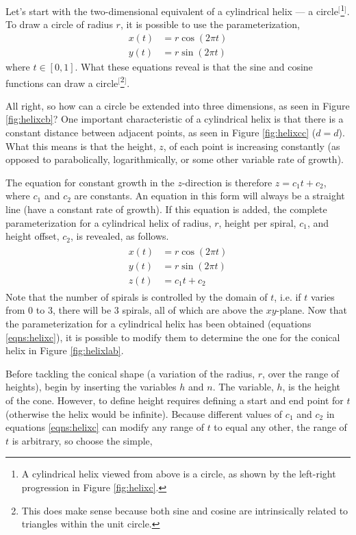 \documentclass{article}
\begin{document}
Let's start with the two-dimensional equivalent of a cylindrical helix --- a circle$^[$\footnote{A cylindrical helix viewed from above is a circle, as shown by the left-right progression in Figure \ref{fig:helixc}.}$^]$. To draw a circle of radius $r$, it is possible to use the parameterization,
\begin{align*}
    x(t) &= r\cos(2\pi t)\\
    y(t) &= r\sin(2\pi t)
\end{align*}
where $t\in[0,1]$. What these equations reveal is that the sine and cosine functions can draw a circle$^[$\footnote{This does make sense because both sine and cosine are intrinsically related to triangles within the unit circle.}$^]$.\par
All right, so how can a circle be extended into three dimensions, as seen in Figure \ref{fig:helixcb}? One important characteristic of a cylindrical helix is that there is a constant distance between adjacent points, as seen in Figure \ref{fig:helixcc} ($d=d$). What this means is that the height, $z$, of each point is increasing constantly (as opposed to parabolically, logarithmically, or some other variable rate of growth).\par
The equation for constant growth in the $z$-direction is therefore $z=c_1t+c_2$, where $c_1$ and $c_2$ are constants. An equation in this form will always be a straight line (have a constant rate of growth). If this equation is added, the complete parameterization for a cylindrical helix of radius, $r$, height per spiral, $c_1$, and height offset, $c_2$, is revealed, as follows.
\begin{align}\label{eqns:helixc}
    \begin{split}
        x(t) &= r\cos(2\pi t)\\
        y(t) &= r\sin(2\pi t)\\
        z(t) &= c_1t+c_2
    \end{split}
\end{align}
Note that the number of spirals is controlled by the domain of $t$, i.e. if $t$ varies from $0$ to $3$, there will be $3$ spirals, all of which are above the $xy$-plane. Now that the parameterization for a cylindrical helix has been obtained (equations \ref{eqns:helixc}), it is possible to modify them to determine the one for the conical helix in Figure \ref{fig:helixlab}.\par
Before tackling the conical shape (a variation of the radius, $r$, over the range of heights), begin by inserting the variables $h$ and $n$. The variable, $h$, is the height of the cone. However, to define height requires defining a start and end point for $t$ (otherwise the helix would be infinite). Because different values of $c_1$ and $c_2$ in equations \ref{eqns:helixc} can modify any range of $t$ to equal any other, the range of $t$ is arbitrary, so choose the simple,
\end{document}
